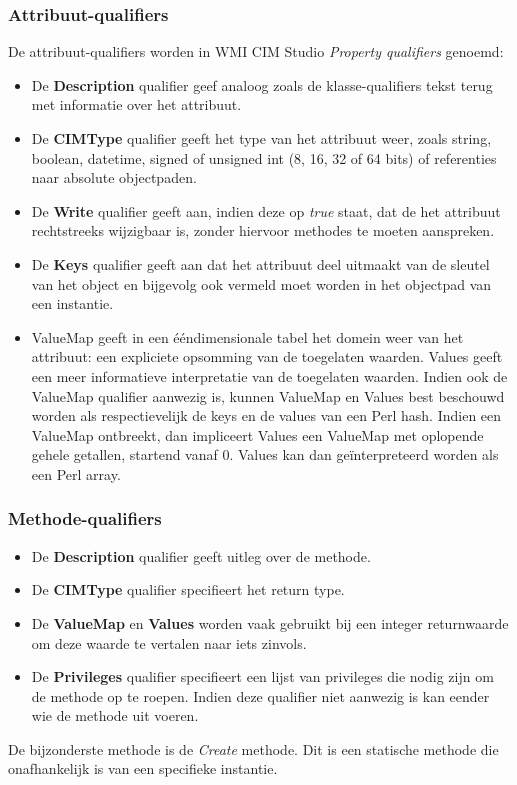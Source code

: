 \documentclass{report}
\begin{document}
	\subsubsection{Attribuut-qualifiers}
	De attribuut-qualifiers worden in WMI CIM Studio \textit{Property qualifiers} genoemd:
	\begin{itemize}
		\item De \textbf{Description} qualifier geef analoog zoals de klasse-qualifiers tekst terug met informatie over het attribuut.
		\item De \textbf{CIMType} qualifier geeft het type van het attribuut weer, zoals string, boolean, datetime, signed of unsigned int (8, 16, 32 of 64 bits) of referenties naar absolute objectpaden.
		\item De \textbf{Write} qualifier geeft aan, indien deze op \textit{true} staat, dat de het attribuut rechtstreeks wijzigbaar is, zonder hiervoor methodes te moeten aanspreken. 
		\item De \textbf{Keys} qualifier geeft aan dat het attribuut deel uitmaakt van de sleutel van het object en bijgevolg ook vermeld moet worden in het objectpad van een instantie.
		\item ValueMap geeft in een ééndimensionale tabel het domein weer van het attribuut: een expliciete opsomming van de toegelaten waarden.
			  Values geeft een meer informatieve interpretatie van de toegelaten waarden. Indien ook de ValueMap qualifier aanwezig is, kunnen ValueMap en Values best beschouwd worden als respectievelijk de keys en de values van een Perl hash. Indien een ValueMap ontbreekt, dan impliceert Values een ValueMap met oplopende gehele getallen, startend vanaf 0. Values kan dan geïnterpreteerd worden als een Perl array.
	\end{itemize}
	\subsubsection{Methode-qualifiers}
	\begin{itemize}
		\item De \textbf{Description} qualifier geeft uitleg over de methode.
		\item De \textbf{CIMType} qualifier specifieert het return type.
		\item De \textbf{ValueMap} en \textbf{Values} worden vaak gebruikt bij een integer returnwaarde om deze waarde te vertalen naar iets zinvols.
		\item De \textbf{Privileges} qualifier specifieert een lijst van privileges die nodig zijn om de methode op te roepen. Indien deze qualifier niet aanwezig is kan eender wie de methode uit voeren.
	\end{itemize}
	De bijzonderste methode is de \textit{Create} methode. Dit is een statische methode die onafhankelijk is van een specifieke instantie. 
	
\end{document}
